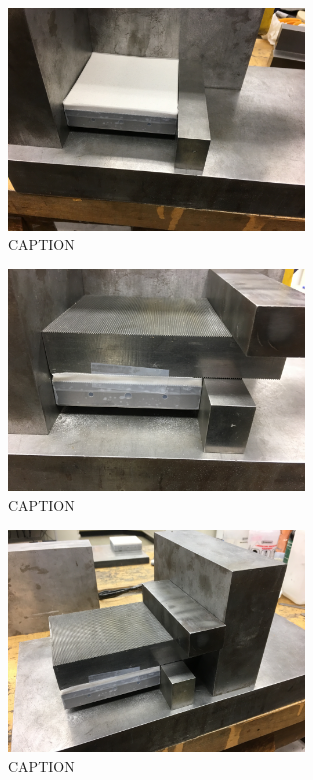 \clearpage

\begin{figure}
	\centering
        \includegraphics[width=0.7\textwidth]{appendix_sample_prep/dds_sideblock_jig_2.jpg}
   	\caption{CAPTION}
  	\label{Fig:dds_sideblock_jig_2}
\end{figure}

\begin{figure}
	\centering
        \includegraphics[width=0.7\textwidth]{appendix_sample_prep/dds_centerblock_jig.jpg}
   	\caption{CAPTION}
  	\label{Fig:dds_centerblock_jig}
\end{figure}

\begin{figure}
	\centering
        \includegraphics[width=0.7\textwidth]{appendix_sample_prep/dds_move_block.jpg}
   	\caption{CAPTION}
  	\label{Fig:dds_move_block}
\end{figure}


